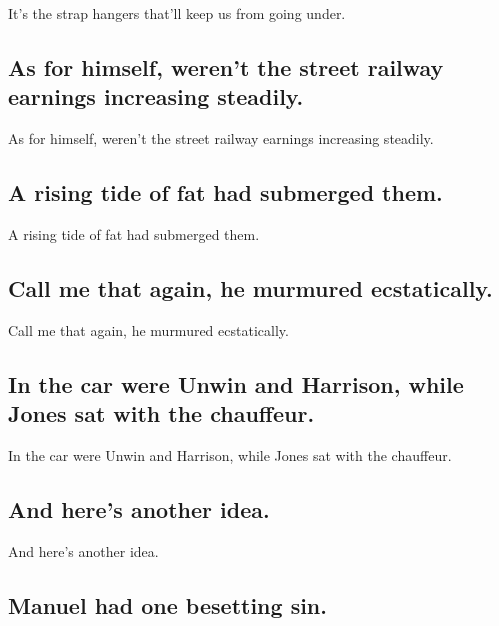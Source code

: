 \documentclass[]{article}
\begin{document}
It's the strap hangers that'll keep us from going under.

\hypertarget{as-for-himself-werent-the-street-railway-earnings-increasing-steadily.}{%
\subsection{As for himself, weren't the street railway earnings
increasing
steadily.}\label{as-for-himself-werent-the-street-railway-earnings-increasing-steadily.}}

As for himself, weren't the street railway earnings increasing steadily.

\hypertarget{a-rising-tide-of-fat-had-submerged-them.}{%
\subsection{A rising tide of fat had submerged
them.}\label{a-rising-tide-of-fat-had-submerged-them.}}

A rising tide of fat had submerged them.

\hypertarget{call-me-that-again-he-murmured-ecstatically.}{%
\subsection{Call me that again, he murmured
ecstatically.}\label{call-me-that-again-he-murmured-ecstatically.}}

Call me that again, he murmured ecstatically.

\hypertarget{in-the-car-were-unwin-and-harrison-while-jones-sat-with-the-chauffeur.}{%
\subsection{In the car were Unwin and Harrison, while Jones sat with the
chauffeur.}\label{in-the-car-were-unwin-and-harrison-while-jones-sat-with-the-chauffeur.}}

In the car were Unwin and Harrison, while Jones sat with the chauffeur.

\hypertarget{and-heres-another-idea.}{%
\subsection{And here's another idea.}\label{and-heres-another-idea.}}

And here's another idea.

\hypertarget{manuel-had-one-besetting-sin.}{%
\subsection{Manuel had one besetting
sin.}\label{manuel-had-one-besetting-sin.}}
\end{document}
